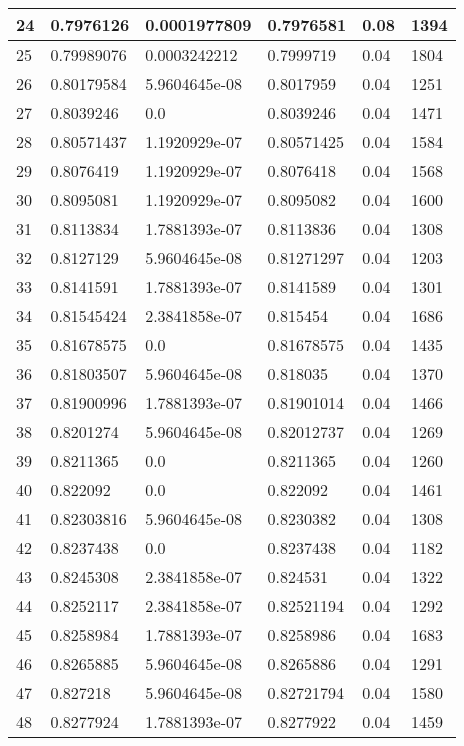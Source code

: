 \begin{longtable}{|l|l|l|l|l|l|}
24 & 0.7976126 & 0.0001977809 & 0.7976581 & 0.08 & 1394 \\ \hline 
25 & 0.79989076 & 0.0003242212 & 0.7999719 & 0.04 & 1804 \\ \hline 
26 & 0.80179584 & 5.9604645e-08 & 0.8017959 & 0.04 & 1251 \\ \hline 
27 & 0.8039246 & 0.0 & 0.8039246 & 0.04 & 1471 \\ \hline 
28 & 0.80571437 & 1.1920929e-07 & 0.80571425 & 0.04 & 1584 \\ \hline 
29 & 0.8076419 & 1.1920929e-07 & 0.8076418 & 0.04 & 1568 \\ \hline 
30 & 0.8095081 & 1.1920929e-07 & 0.8095082 & 0.04 & 1600 \\ \hline 
31 & 0.8113834 & 1.7881393e-07 & 0.8113836 & 0.04 & 1308 \\ \hline 
32 & 0.8127129 & 5.9604645e-08 & 0.81271297 & 0.04 & 1203 \\ \hline 
33 & 0.8141591 & 1.7881393e-07 & 0.8141589 & 0.04 & 1301 \\ \hline 
34 & 0.81545424 & 2.3841858e-07 & 0.815454 & 0.04 & 1686 \\ \hline 
35 & 0.81678575 & 0.0 & 0.81678575 & 0.04 & 1435 \\ \hline 
36 & 0.81803507 & 5.9604645e-08 & 0.818035 & 0.04 & 1370 \\ \hline 
37 & 0.81900996 & 1.7881393e-07 & 0.81901014 & 0.04 & 1466 \\ \hline 
38 & 0.8201274 & 5.9604645e-08 & 0.82012737 & 0.04 & 1269 \\ \hline 
39 & 0.8211365 & 0.0 & 0.8211365 & 0.04 & 1260 \\ \hline 
40 & 0.822092 & 0.0 & 0.822092 & 0.04 & 1461 \\ \hline 
41 & 0.82303816 & 5.9604645e-08 & 0.8230382 & 0.04 & 1308 \\ \hline 
42 & 0.8237438 & 0.0 & 0.8237438 & 0.04 & 1182 \\ \hline 
43 & 0.8245308 & 2.3841858e-07 & 0.824531 & 0.04 & 1322 \\ \hline 
44 & 0.8252117 & 2.3841858e-07 & 0.82521194 & 0.04 & 1292 \\ \hline 
45 & 0.8258984 & 1.7881393e-07 & 0.8258986 & 0.04 & 1683 \\ \hline 
46 & 0.8265885 & 5.9604645e-08 & 0.8265886 & 0.04 & 1291 \\ \hline 
47 & 0.827218 & 5.9604645e-08 & 0.82721794 & 0.04 & 1580 \\ \hline 
48 & 0.8277924 & 1.7881393e-07 & 0.8277922 & 0.04 & 1459 \\ \hline 

\end{longtable}
